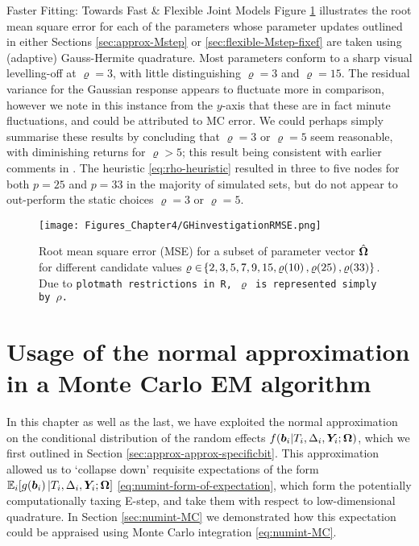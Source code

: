 \begin{chapter}{\label{cha:flexible}Faster Fitting: Towards Fast \& Flexible Joint Models}
Figure \ref{fig:flexbile-quadrature} illustrates the root mean square error for each of the parameters whose parameter updates outlined in either Sections \ref{sec:approx-Mstep} or \ref{sec:flexible-Mstep-fixef} are taken using (adaptive) Gauss-Hermite quadrature. Most parameters conform to a sharp visual levelling-off at $\varrho=3$, with little distinguishing $\varrho=3$ and $\varrho=15$. The residual variance for the Gaussian response appears to fluctuate more in comparison, however we note in this instance from the $y$-axis that these are in fact minute fluctuations, and could be attributed to MC error. We could perhaps simply summarise these results by concluding that $\varrho=3$ or $\varrho=5$ seem reasonable, with diminishing returns for $\varrho>5$; this result being consistent with earlier comments in \citet{Rizopoulos2012}. The heuristic \eqref{eq:rho-heuristic} resulted in three to five nodes for both $p=25$ and $p=33$ in the majority of simulated sets, but do not appear to out-perform the static choices $\varrho=3$ or $\varrho=5$.

\begin{figure}
    \centering
    \texttt{[image: Figures\_Chapter4/GHinvestigationRMSE.png]}
    \caption{Root mean square error (MSE) for a subset of parameter vector $\hat{\bm{\Omega}}$ for different candidate values $\varrho\in\!\left\{2,3,5,7,9,15,\varrho\!\left(10\right),\varrho\!\left(25\right),\varrho\!\left(33\right)\right\}$. Due to \tt{plotmath} restrictions in \tt{R}, $\varrho$ is represented simply by $\rho$.}
    \label{fig:flexbile-quadrature}
\end{figure}

\section{Usage of the normal approximation in a Monte Carlo EM algorithm}\label{sec:flexible-mc-em}

In this chapter as well as the last, we have exploited the normal approximation on the conditional distribution of the random effects $f\!\left(\bm{b}_i|T_i, \Delta_i, \bm{Y}_i; \bm{\mathrm{\Omega}}\right)$, which we first outlined in Section \ref{sec:approx-approx-specificbit}. This approximation allowed us to `collapse down' requisite expectations of the form $\mathbb{E}_i\!\left[ g\!\left(\bm{b}_i\right)|T_i,\Delta_i,\bm{Y}_i;\bm{\mathrm{\Omega}}\right]$ \eqref{eq:numint-form-of-expectation}, which form the potentially computationally taxing E-step, and take them with respect to low-dimensional quadrature. In Section \ref{sec:numint-MC} we demonstrated how this expectation could be appraised using Monte Carlo integration \eqref{eq:numint-MC}.


\end{chapter}
